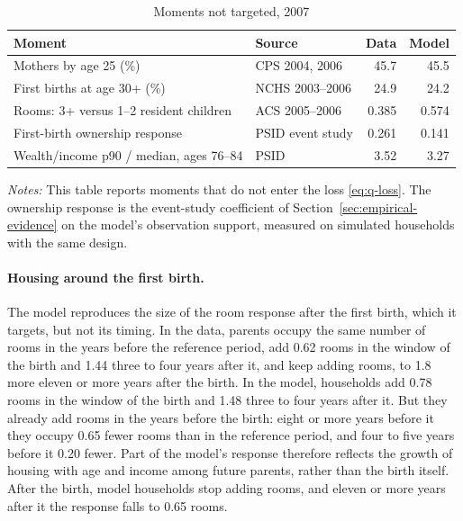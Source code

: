 \begin{table}[t]
\centering
\caption{Moments not targeted, 2007}
\label{tab:quant-untargeted}
\small
\begin{tabularx}{\textwidth}{@{}X l r r@{}}
\toprule
Moment & Source & Data & Model \\
\midrule
Mothers by age 25 (\%) & CPS 2004, 2006 & 45.7 & 45.5 \\
First births at age 30+ (\%) & NCHS 2003--2006 & 24.9 & 24.2 \\
Rooms: 3+ versus 1--2 resident children & ACS 2005--2006 & 0.385 & 0.574 \\
First-birth ownership response & PSID event study & 0.261 & 0.141 \\
Wealth/income p90 / median, ages 76--84 & PSID & 3.52 & 3.27 \\
\bottomrule
\end{tabularx}
\par\smallskip
\begin{minipage}{0.95\linewidth}
\footnotesize\textit{Notes:} This table reports moments that do not enter
the loss \eqref{eq:q-loss}. The ownership response is the event-study
coefficient of Section~\ref{sec:empirical-evidence} on the model's
observation support, measured on simulated households with the same design.
\end{minipage}
\end{table}

\paragraph{Housing around the first birth.}
The model reproduces the size of the room response after the first birth,
which it targets, but not its timing. In the data, parents occupy the same
number of rooms in the years before the reference period, add 0.62 rooms in
the window of the birth and 1.44 three to four years after it, and keep
adding rooms, to 1.8 more eleven or more years after the birth. In the
model, households add 0.78 rooms in the window of the birth and 1.48 three to
four years after it. But they already add rooms in the years before the
birth: eight or more years before it they occupy 0.65 fewer rooms than in
the reference period, and four to five years before it 0.20 fewer. Part of
the model's response therefore reflects the growth of housing with age and
income among future parents, rather than the birth itself. After the birth,
model households stop adding rooms, and eleven or more years after it the
response falls to 0.65 rooms.

